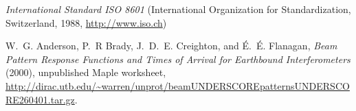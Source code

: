 \begin{thebibliography}{1}
  \textit{International Standard ISO 8601} (International Organization for
  Standardization, Switzerland, 1988, \url{http://www.iso.ch})
  
 W.~G. Anderson, P.~R Brady, J.~D.~E. Creighton,
  and \'E.~\'E. Flanagan, \emph{Beam Pattern Response Functions and
  Times of Arrival for Earthbound Interferometers} (2000), unpublished
  Maple worksheet,
  \url{http://dirac.utb.edu/~warren/unprot/beamUNDERSCOREpatternsUNDERSCORE260401.tar.gz}.
  
\end{thebibliography}

